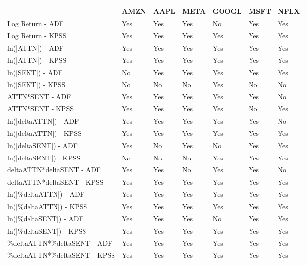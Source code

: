 \begin{tabular}{lllllll}
\toprule
{} & AMZN & AAPL & META & GOOGL & MSFT & NFLX \\
\midrule
Log Return - ADF             &  Yes &  Yes &  Yes &    No &  Yes &  Yes \\
Log Return - KPSS            &  Yes &  Yes &  Yes &   Yes &  Yes &  Yes \\
ln(|ATTN|) - ADF             &  Yes &  Yes &  Yes &   Yes &  Yes &  Yes \\
ln(|ATTN|) - KPSS            &  Yes &  Yes &  Yes &   Yes &  Yes &  Yes \\
ln(|SENT|) - ADF             &   No &  Yes &  Yes &   Yes &  Yes &  Yes \\
ln(|SENT|) - KPSS            &   No &   No &   No &   Yes &   No &   No \\
ATTN*SENT - ADF              &  Yes &  Yes &  Yes &   Yes &  Yes &   No \\
ATTN*SENT - KPSS             &  Yes &  Yes &  Yes &   Yes &   No &  Yes \\
ln(|deltaATTN|) - ADF        &  Yes &  Yes &  Yes &   Yes &  Yes &   No \\
ln(|deltaATTN|) - KPSS       &  Yes &  Yes &  Yes &   Yes &  Yes &  Yes \\
ln(|deltaSENT|) - ADF        &  Yes &   No &  Yes &    No &  Yes &  Yes \\
ln(|deltaSENT|) - KPSS       &   No &   No &   No &   Yes &  Yes &  Yes \\
deltaATTN*deltaSENT - ADF    &  Yes &  Yes &   No &   Yes &  Yes &   No \\
deltaATTN*deltaSENT - KPSS   &  Yes &  Yes &  Yes &   Yes &  Yes &  Yes \\
ln(|\%deltaATTN|) - ADF       &  Yes &  Yes &  Yes &   Yes &  Yes &  Yes \\
ln(|\%deltaATTN|) - KPSS      &  Yes &  Yes &  Yes &   Yes &  Yes &  Yes \\
ln(|\%deltaSENT|) - ADF       &  Yes &  Yes &  Yes &    No &  Yes &  Yes \\
ln(|\%deltaSENT|) - KPSS      &  Yes &  Yes &  Yes &   Yes &  Yes &  Yes \\
\%deltaATTN*\%deltaSENT - ADF  &  Yes &  Yes &  Yes &   Yes &  Yes &  Yes \\
\%deltaATTN*\%deltaSENT - KPSS &  Yes &  Yes &  Yes &   Yes &  Yes &  Yes \\
\bottomrule
\end{tabular}
